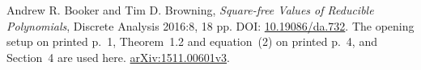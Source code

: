 Andrew R. Booker and Tim D. Browning,
\emph{Square-free Values of Reducible Polynomials},
Discrete Analysis 2016:8, 18 pp.
DOI: \href{https://doi.org/10.19086/da.732}{10.19086/da.732}.
The opening setup on printed p.~1, Theorem~1.2 and equation~(2)
on printed p.~4, and Section~4 are used here.
\href{https://arxiv.org/pdf/1511.00601}{arXiv:1511.00601v3}.
